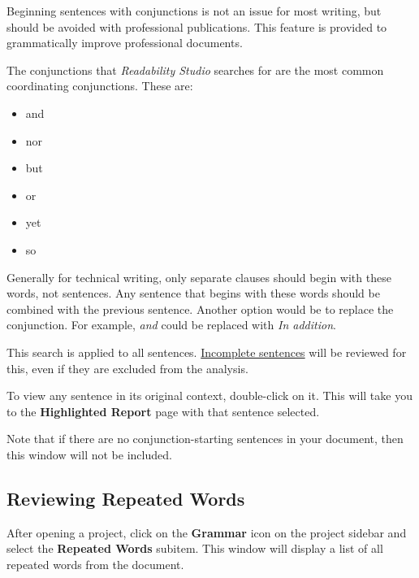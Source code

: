 \documentclass[
]{book}
\providecommand{\tightlist}{%
  \setlength{\itemsep}{0pt}\setlength{\parskip}{0pt}}
\theoremstyle{definition}
\theoremstyle{definition}
\theoremstyle{definition}
\theoremstyle{definition}
\theoremstyle{remark}
\begin{document}
Beginning sentences with conjunctions is not an issue for most writing, but should be avoided with professional publications. This feature is provided to grammatically improve professional documents.

The conjunctions that \emph{Readability Studio} searches for are the most common coordinating conjunctions. These are:

\begin{itemize}
\tightlist
\item
  and
\item
  nor
\item
  but
\item
  or
\item
  yet
\item
  so
\end{itemize}

Generally for technical writing, only separate clauses should begin with these words, not sentences. Any sentence that begins with these words should be combined with the previous sentence. Another option would be to replace the conjunction. For example, \emph{and} could be replaced with \emph{In addition}.

This search is applied to all sentences. \protect\hyperlink{how-text-is-excluded}{Incomplete sentences} will be reviewed for this, even if they are excluded from the analysis.

To view any sentence in its original context, double-click on it. This will take you to the \textbf{Highlighted Report} page with that sentence selected.

Note that if there are no conjunction-starting sentences in your document, then this window will not be included.

\hypertarget{reviewing-repeated-words}{%
\subsection*{Reviewing Repeated Words}\label{reviewing-repeated-words}}

After opening a project, click on the \textbf{Grammar} icon on the project sidebar and select the \textbf{Repeated Words} subitem. This window will display a list of all repeated words from the document.
\end{document}
